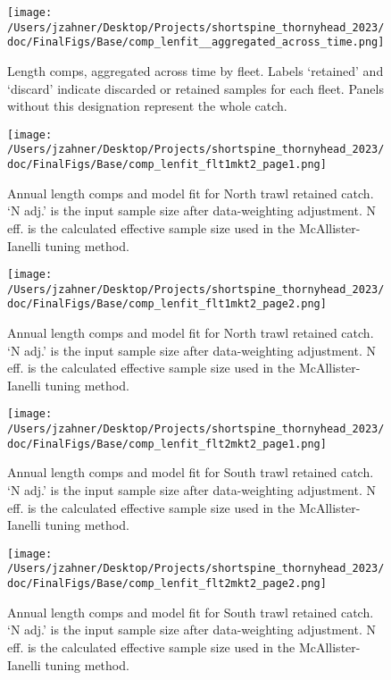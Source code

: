 \documentclass[11pt,
  english,
  letterpaper,
]{article}
\begin{document}
\begin{figure}
\centering
\texttt{[image: /Users/jzahner/Desktop/Projects/shortspine\_thornyhead\_2023/doc/FinalFigs/Base/comp\_lenfit\_\_aggregated\_across\_time.png]}
\caption{Length comps, aggregated across time by fleet. Labels `retained' and `discard' indicate discarded or retained samples for each fleet. Panels without this designation represent the whole catch.\label{fig:lencomps_all}}
\end{figure}

\begin{figure}
\centering
\texttt{[image: /Users/jzahner/Desktop/Projects/shortspine\_thornyhead\_2023/doc/FinalFigs/Base/comp\_lenfit\_flt1mkt2\_page1.png]}
\caption{Annual length comps and model fit for North trawl retained catch. `N adj.' is the input sample size after data-weighting adjustment. N eff. is the calculated effective sample size used in the McAllister-Ianelli tuning method.\label{fig:ntrawl_comps_1}}
\end{figure}

\begin{figure}
\centering
\texttt{[image: /Users/jzahner/Desktop/Projects/shortspine\_thornyhead\_2023/doc/FinalFigs/Base/comp\_lenfit\_flt1mkt2\_page2.png]}
\caption{Annual length comps and model fit for North trawl retained catch. `N adj.' is the input sample size after data-weighting adjustment. N eff. is the calculated effective sample size used in the McAllister-Ianelli tuning method.\label{fig:ntrawl_comps_2}}
\end{figure}

\begin{figure}
\centering
\texttt{[image: /Users/jzahner/Desktop/Projects/shortspine\_thornyhead\_2023/doc/FinalFigs/Base/comp\_lenfit\_flt2mkt2\_page1.png]}
\caption{Annual length comps and model fit for South trawl retained catch. `N adj.' is the input sample size after data-weighting adjustment. N eff. is the calculated effective sample size used in the McAllister-Ianelli tuning method.\label{fig:strawl_comps_1}}
\end{figure}

\begin{figure}
\centering
\texttt{[image: /Users/jzahner/Desktop/Projects/shortspine\_thornyhead\_2023/doc/FinalFigs/Base/comp\_lenfit\_flt2mkt2\_page2.png]}
\caption{Annual length comps and model fit for South trawl retained catch. `N adj.' is the input sample size after data-weighting adjustment. N eff. is the calculated effective sample size used in the McAllister-Ianelli tuning method.\label{fig:strawl_comps_2}}
\end{figure}
\end{document}
